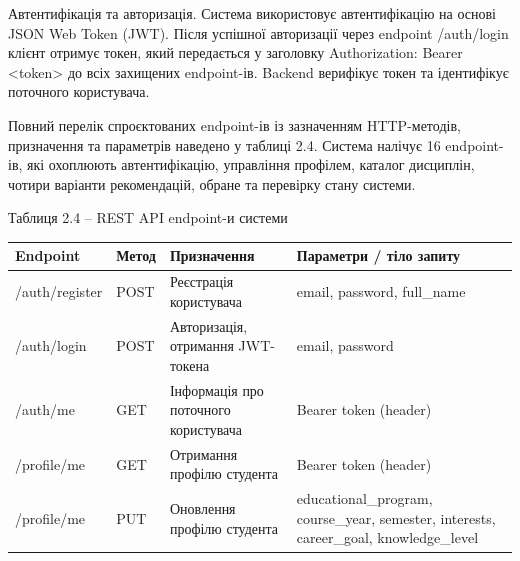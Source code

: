 \documentclass[
]{article}
\newcounter{none} %
\begin{document}
Автентифікація та авторизація. Система використовує автентифікацію на
основі JSON Web Token (JWT). Після успішної авторизації через endpoint
/auth/login клієнт отримує токен, який передається у заголовку
Authorization: Bearer \textless token\textgreater{} до всіх захищених
endpoint-ів. Backend верифікує токен та ідентифікує поточного
користувача.

Повний перелік спроєктованих endpoint-ів із зазначенням HTTP-методів,
призначення та параметрів наведено у таблиці 2.4. Система налічує 16
endpoint-ів, які охоплюють автентифікацію, управління профілем, каталог
дисциплін, чотири варіанти рекомендацій, обране та перевірку стану
системи.

Таблиця 2.4 -- REST API endpoint-и системи

{\def\LTcaptype{none} %
\begin{longtable}[]{@{}
  >{\raggedright\arraybackslash}p{}
  >{\raggedright\arraybackslash}p{}
  >{\raggedright\arraybackslash}p{}
  >{\raggedright\arraybackslash}p{}@{}}
\toprule\noalign{}
\begin{minipage}[b]{\linewidth}\raggedright
\textbf{Endpoint}
\end{minipage} & \begin{minipage}[b]{\linewidth}\raggedright
\textbf{Метод}
\end{minipage} & \begin{minipage}[b]{\linewidth}\raggedright
\textbf{Призначення}
\end{minipage} & \begin{minipage}[b]{\linewidth}\raggedright
\textbf{Параметри / тіло запиту}
\end{minipage} \\
\midrule\noalign{}
\endhead
\bottomrule\noalign{}
\endlastfoot
/auth/register & POST & Реєстрація користувача & email, password,
full\_name \\
/auth/login & POST & Авторизація, отримання JWT-токена & email,
password \\
/auth/me & GET & Інформація про поточного користувача & Bearer token
(header) \\
/profile/me & GET & Отримання профілю студента & Bearer token
(header) \\
/profile/me & PUT & Оновлення профілю студента & educational\_program,
course\_year, semester, interests, career\_goal, knowledge\_level \\

\end{longtable}}
\end{document}
